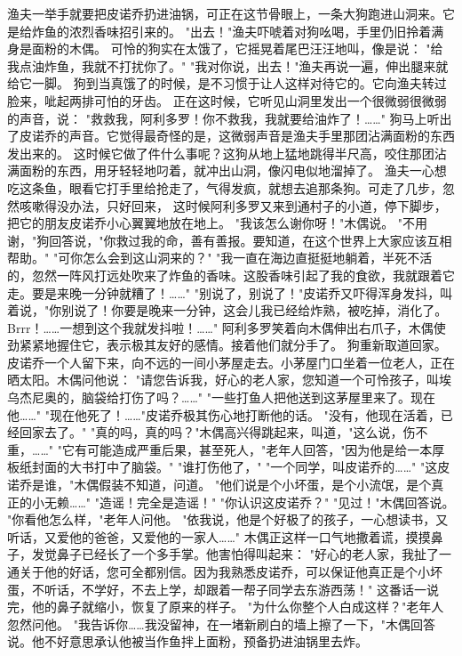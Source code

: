 \documentclass[12pt,UTF8]{ctexbook}
\begin{document}
渔夫一举手就要把皮诺乔扔进油锅，可正在这节骨眼上，一条大狗跑进山洞来。它是给炸鱼的浓烈香味招引来的。
"出去！"渔夫吓唬着对狗吆喝，手里仍旧拎着满身是面粉的木偶。
可怜的狗实在太饿了，它摇晃着尾巴汪汪地叫，像是说：
"给我点油炸鱼，我就不打扰你了。"
"我对你说，出去！"渔夫再说一遍，伸出腿来就给它一脚。
狗到当真饿了的时候，是不习惯于让人这样对待它的。它向渔夫转过脸来，呲起两排可怕的牙齿。
正在这时候，它听见山洞里发出一个很微弱很微弱的声音，说：
"救救我，阿利多罗！你不救我，我就要给油炸了！……"
狗马上听出了皮诺乔的声音。它觉得最奇怪的是，这微弱声音是渔夫手里那团沾满面粉的东西发出来的。
这时候它做了件什么事呢？这狗从地上猛地跳得半尺高，咬住那团沾满面粉的东西，用牙轻轻地叼着，就冲出山洞，像闪电似地溜掉了。
渔夫一心想吃这条鱼，眼看它打手里给抢走了，气得发疯，就想去追那条狗。可走了几步，忽然咳嗽得没办法，只好回来，
这时候阿利多罗又来到通村子的小道，停下脚步，把它的朋友皮诺乔小心翼翼地放在地上。
"我该怎么谢你呀！"木偶说。
"不用谢，"狗回答说，"你救过我的命，善有善报。要知道，在这个世界上大家应该互相帮助。"
"可你怎么会到这山洞来的？"
"我一直在海边直挺挺地躺着，半死不活的，忽然一阵风打远处吹来了炸鱼的香味。这股香味引起了我的食欲，我就跟着它走。要是来晚一分钟就糟了！……"
"别说了，别说了！"皮诺乔又吓得浑身发抖，叫着说，"你别说了！你要是晚来一分钟，这会儿我已经给炸熟，被吃掉，消化了。Brrr！……一想到这个我就发抖啦！……"
阿利多罗笑着向木偶伸出右爪子，木偶使劲紧紧地握住它，表示极其友好的感情。接着他们就分手了。
狗重新取道回家。皮诺乔一个人留下来，向不远的一间小茅屋走去。小茅屋门口坐着一位老人，正在晒太阳。木偶问他说：
"请您告诉我，好心的老人家，您知道一个可怜孩子，叫埃乌杰尼奥的，脑袋给打伤了吗？……"
"一些打鱼人把他送到这茅屋里来了。现在他……"
"现在他死了！……"皮诺乔极其伤心地打断他的话。
"没有，他现在活着，已经回家去了。"
"真的吗，真的吗？"木偶高兴得跳起来，叫道，"这么说，伤不重，……"
"它有可能造成严重后果，甚至死人，"老年人回答，"因为他是给一本厚板纸封面的大书打中了脑袋。"
"谁打伤他了，"
"一个同学，叫皮诺乔的……"
"这皮诺乔是谁，"木偶假装不知道，问道。
"他们说是个小坏蛋，是个小流氓，是个真正的小无赖……"
"造谣！完全是造谣！"
"你认识这皮诺乔？"
"见过！"木偶回答说。
"你看他怎么样，"老年人问他。
"依我说，他是个好极了的孩子，一心想读书，又听话，又爱他的爸爸，又爱他的一家人……"
木偶正这样一口气地撒着谎，摸摸鼻子，发觉鼻子已经长了一个多手掌。他害怕得叫起来：
"好心的老人家，我扯了一通关于他的好话，您可全都别信。因为我熟悉皮诺乔，可以保证他真正是个小坏蛋，不听话，不学好，不去上学，却跟着一帮子同学去东游西荡！"
这番话一说完，他的鼻子就缩小，恢复了原来的样子。
"为什么你整个人白成这样？"老年人忽然问他。
"我告诉你……我没留神，在一堵新刷白的墙上擦了一下，"木偶回答说。他不好意思承认他被当作鱼拌上面粉，预备扔进油锅里去炸。
\end{document}
